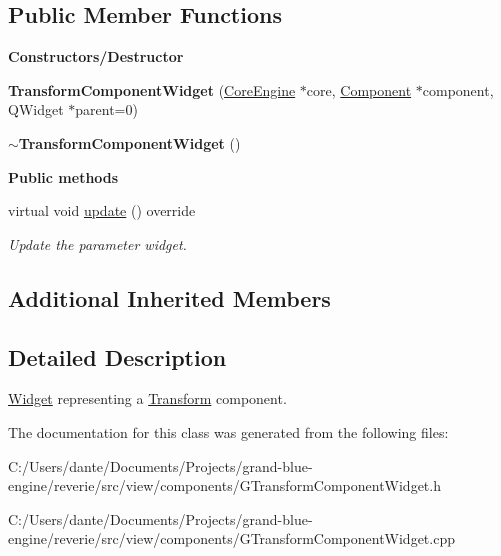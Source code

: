 \subsection*{Public Member Functions}
\begin{Indent}\textbf{ Constructors/\+Destructor}\par
\begin{DoxyCompactItemize}
\item 
\mbox{\label{classrev_1_1_view_1_1_transform_component_widget_a2f4f72062f17c1d6c35763bea9ac75ae}} 
{\bfseries Transform\+Component\+Widget} (\mbox{\hyperlink{classrev_1_1_core_engine}{Core\+Engine}} $\ast$core, \mbox{\hyperlink{classrev_1_1_component}{Component}} $\ast$component, Q\+Widget $\ast$parent=0)
\item 
\mbox{\label{classrev_1_1_view_1_1_transform_component_widget_adc06f1c3b36b45becba94cc60a7096f5}} 
{\bfseries $\sim$\+Transform\+Component\+Widget} ()
\end{DoxyCompactItemize}
\end{Indent}
\begin{Indent}\textbf{ Public methods}\par
\begin{DoxyCompactItemize}
\item 
\mbox{\label{classrev_1_1_view_1_1_transform_component_widget_af8c3b909fe90fa0a2b7495033deb46b1}} 
virtual void \mbox{\hyperlink{classrev_1_1_view_1_1_transform_component_widget_af8c3b909fe90fa0a2b7495033deb46b1}{update}} () override
\begin{DoxyCompactList}\small\item\em Update the parameter widget. \end{DoxyCompactList}\end{DoxyCompactItemize}
\end{Indent}
\subsection*{Additional Inherited Members}


\subsection{Detailed Description}
\mbox{\hyperlink{class_widget}{Widget}} representing a \mbox{\hyperlink{classrev_1_1_transform}{Transform}} component. 

The documentation for this class was generated from the following files\+:\begin{DoxyCompactItemize}
\item 
C\+:/\+Users/dante/\+Documents/\+Projects/grand-\/blue-\/engine/reverie/src/view/components/G\+Transform\+Component\+Widget.\+h\item 
C\+:/\+Users/dante/\+Documents/\+Projects/grand-\/blue-\/engine/reverie/src/view/components/G\+Transform\+Component\+Widget.\+cpp\end{DoxyCompactItemize}
